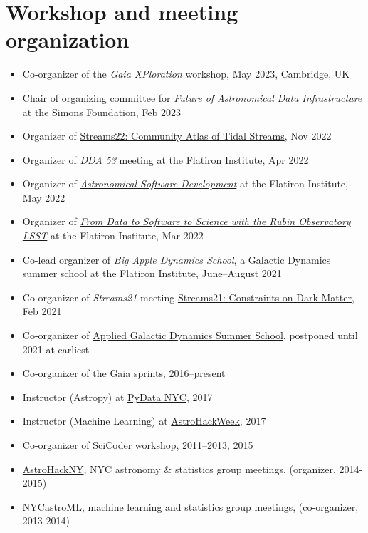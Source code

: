 \documentclass[12pt, letterpaper]{apw-cv}
\begin{document}
\section*{Workshop and meeting organization}

\begin{itemize}
    \item Co-organizer of the \emph{Gaia XPloration} workshop, May 2023, Cambridge, UK
    \item Chair of organizing committee for \textit{Future of Astronomical Data Infrastructure} at the Simons Foundation, Feb 2023
    \item Organizer of \href{https://stellarstreams.org/streams22}{Streams22: Community Atlas of Tidal Streams}, Nov 2022
    \item Organizer of \textit{DDA 53} meeting at the Flatiron Institute, Apr 2022
    \item Organizer of \href{https://code.astrodata.nyc/}{\textit{Astronomical Software Development}} at the Flatiron Institute, May 2022
    \item Organizer of \href{https://indico.flatironinstitute.org/event/2777/}{\textit{From Data to Software to Science with the Rubin Observatory LSST}} at the Flatiron Institute, Mar 2022
    \item Co-lead organizer of \textit{Big Apple Dynamics School}, a Galactic Dynamics summer school at the Flatiron Institute, June--August 2021
    \item Co-organizer of \textit{Streams21} meeting \href{https://stellarstreams.org/streams21}{Streams21: Constraints on Dark Matter}, Feb 2021
    \item Co-organizer of \href{http://galacticdynamics.nyc/}{Applied Galactic Dynamics Summer School}, postponed until 2021 at earliest
    \item Co-organizer of the \href{http://gaia.lol}{Gaia sprints}, 2016--present
    \item Instructor (Astropy) at \href{http://pydata.org/nyc2017}{PyData NYC}, 2017
    \item Instructor (Machine Learning) at \href{http://astrohackweek.org}{AstroHackWeek}, 2017
    \item Co-organizer of \href{http://scicoder.org}{SciCoder workshop}, 2011--2013, 2015
    \item \href{https://groups.google.com/forum/#!forum/astrohackny}{AstroHackNY}, NYC astronomy \& statistics group meetings, (organizer, 2014-2015)
    \item \href{https://github.com/adrn/nycastroml}{NYCastroML}, machine learning and statistics group meetings, (co-organizer, 2013-2014)
\end{itemize}
\end{document}
